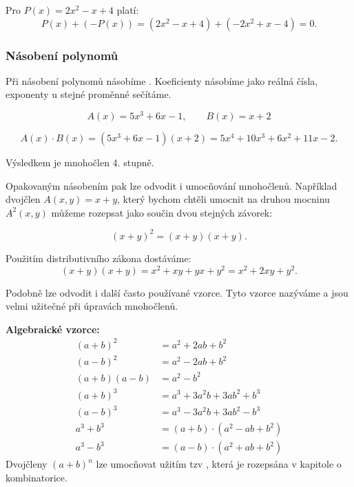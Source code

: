 \documentclass[12pt,a4paper]{article}
\begin{document}
\begin{examplebox}
Pro $P(x) = 2x^2 - x + 4$ platí:
\[
P(x) + (-P(x)) = (2x^2 - x + 4) + (-2x^2 + x - 4) = 0.
\]
\end{examplebox}



\subsubsection*{Násobení polynomů}

Při násobení polynomů násobíme .  
Koeficienty násobíme jako reálná čísla, exponenty u stejné proměnné sečítáme.

\begin{examplebox}
\[
A(x) = 5x^3 + 6x - 1, \qquad B(x) = x + 2
\]

\[
A(x)\cdot B(x) = (5x^3 + 6x - 1)(x+2) = 5x^4 + 10x^3 + 6x^2 + 11x - 2.
\]

Výsledkem je mnohočlen 4. stupně.
\end{examplebox}

Opakovaným násobením pak lze odvodit i umocňování mnohočlenů.
Například dvojčlen $A(x,y)=x+y$, který bychom chtěli umocnit na druhou mocninu $A^2(x,y)$ můžeme rozepsat jako součin dvou stejných závorek:  

\[
(x+y)^2 = (x+y)(x+y).
\]

Použitím distributivního zákona dostáváme:
\[
(x+y)(x+y) = x^2 + xy + yx + y^2 = x^2 + 2xy + y^2.
\]

Podobně lze odvodit i další často používané vzorce. 
Tyto vzorce nazýváme  a jsou velmi užitečné při úpravách mnohočlenů.

\begin{notebox}
    \textbf{Algebraické vzorce:}
    \[
    \begin{array}{rl}
        (a+b)^2 &= a^2 + 2ab + b^2 \\[6pt]
        (a-b)^2 &= a^2 - 2ab + b^2 \\[6pt]
        (a+b)(a-b) &= a^2 - b^2 \\[6pt]
        (a+b)^3 &= a^3 + 3a^2b + 3ab^2 + b^3 \\[6pt]
        (a-b)^3 &= a^3 - 3a^2b + 3ab^2 - b^3 \\[6pt]
        a^3 + b^3 &= (a+b)\cdot (a^2 - ab + b^2) \\[6pt]
        a^3 - b^3 &= (a-b)\cdot (a^2 + ab + b^2)
    \end{array}
    \]
    Dvojčleny $(a+b)^n$ lze umocňovat užitím tzv , která je rozepsána v kapitole o kombinatorice.
\end{notebox}
\end{document}
